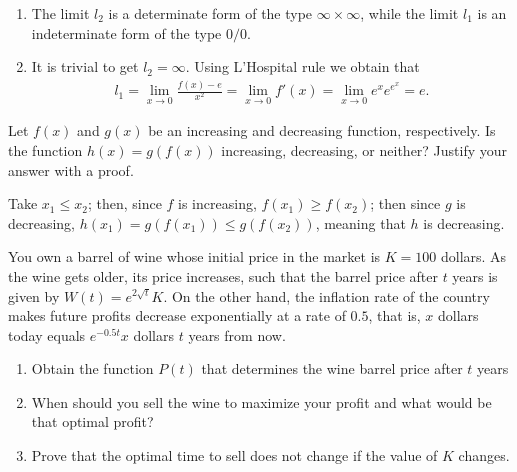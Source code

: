 \documentclass[11pt]{exam}
\begin{document}
\begin{questions}
\begin{solution}[0cm]
\begin{enumerate}[leftmargin = 0.5cm, label = (\alph*), rightmargin = 0.2cm]
        \item The limit $l_2$ is a determinate form of the type $\infty\times\infty$, while the limit $l_1$ is an indeterminate form of the type $0/0$. 

        \item It is trivial to get $l_2 = \infty$. Using L'Hospital rule we obtain that
        \begin{align*}
            l_1 = \lim_{x\rightarrow 0} \frac{f(x) - e}{x^2} 
            = \lim_{x\rightarrow 0} f'(x)
            = \lim_{x\rightarrow 0} e^{x}e^{e^{x}}
            = e.
        \end{align*}
        
    \end{enumerate}
    
    
\end{solution}

\question[1]
    Let $f(x)$ and $g(x)$ be an increasing and decreasing function, respectively. Is the function $h(x) = g(f(x))$ increasing, decreasing, or neither? Justify your answer with a proof.
\begin{solution}[0cm]
    Take $x_1 \leq x_2$; then, since $f$ is increasing, $f(x_1) \geq f(x_2)$; then since $g$ is decreasing, $h(x_1) = g(f(x_1)) \leq g(f(x_2))$, meaning that $h$ is decreasing.
\end{solution}

\question[3]
    You own a barrel of wine whose initial price in the market is $K = 100$ dollars. As the wine gets older, its price increases, such that the barrel price after $t$ years is given by $W(t) = e^{2\sqrt{t}}K$. On the other hand, the inflation rate of the country makes future profits decrease exponentially at a rate of $0.5$, that is, $x$ dollars today equals $e^{-0.5t}x$ dollars $t$ years from now. 

    \begin{enumerate}[leftmargin = 0.5cm, label = (\alph*), rightmargin = 0.2cm]
        
        \item Obtain the function $P(t)$ that determines the wine barrel price after $t$ years

        \item When should you sell the wine to maximize your profit and what would be that optimal profit?

        \item Prove that the optimal time to sell does not change if the value of $K$ changes.
        

\end{enumerate}
\end{questions}
\end{document}
